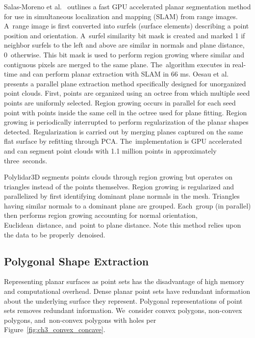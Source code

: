 Salas-Moreno et al.~\cite{salas-moreno_dense_2014} outlines a fast GPU accelerated planar segmentation method for use in simultaneous localization and mapping (SLAM) from range images. A~range image is first converted into surfels (surface elements) describing a point position and orientation. A~surfel similarity bit mask is created and marked 1 if neighbor surfels to the left and above are similar in normals and plane distance, 0~otherwise.  This bit mask is used to perform region growing where similar and contiguous pixels are merged to the same plane. The~algorithm executes in real-time and can perform planar extraction with SLAM in 66 ms.
Oesau et al.~\cite{oesau_planar_2016} presents a parallel plane extraction method specifically designed for unorganized point clouds.  First, points are organized using an octree from which multiple seed points are uniformly selected. Region growing occurs in parallel for each seed point with points inside the same cell in the octree used for plane fitting. Region growing is periodically interrupted to perform regularization of the planar shapes detected. Regularization is carried out by merging planes captured on the same flat surface by refitting through PCA. The~implementation is GPU accelerated and can segment point clouds with 1.1 million points in approximately three~seconds. 

Polylidar3D segments points clouds through region growing but operates on triangles instead of the points themselves. Region growing is regularized and parallelized by first identifying dominant plane normals in the mesh. Triangles having similar normals to a dominant plane are grouped. Each~group (in parallel) then performs region growing accounting for normal orientation, Euclidean~distance, and~point to plane distance. Note this method relies upon the data to be properly~denoised.



\subsection{Polygonal Shape Extraction}\label{sec:ch3_bg_shape_extraction}

Representing planar surfaces as point sets has the disadvantage of high memory and computational overhead.  Dense planar point sets have redundant information about the underlying surface they represent. Polygonal representations of point sets removes redundant information. We~consider convex polygons, non-convex polygons, and~non-convex polygons with holes per Figure~\ref{fig:ch3_convex_concave}.

